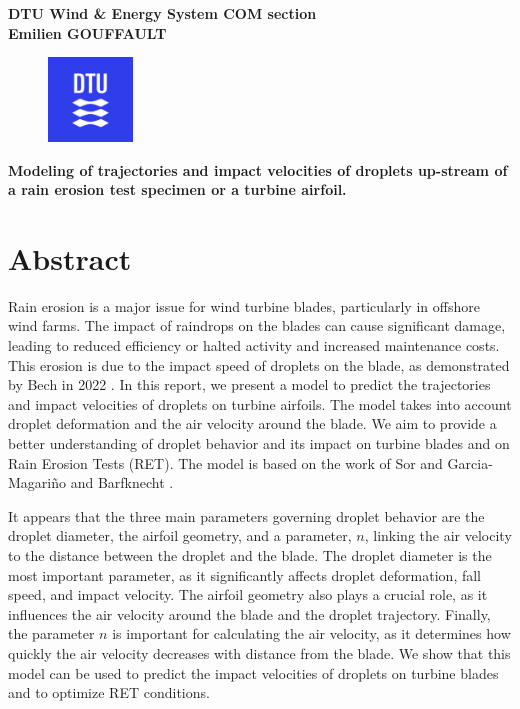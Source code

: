 \documentclass[10pt]{report}
\begin{document}
\noindent

\noindent
{\bf DTU Wind \& Energy System \hfill  COM section\\}
{\bf Emilien GOUFFAULT}

\begin{figure}[H]
    \centering
    \includegraphics[width=0.2\textwidth]{figures/dtuwindenergy_logo.jpeg}
\end{figure}


\begin{center}
{\bf Modeling of trajectories and impact velocities of droplets up-stream of a rain erosion test specimen or a turbine airfoil.}
\end{center}

\section*{Abstract}
\par Rain erosion is a major issue for wind turbine blades, particularly in offshore wind farms. The impact of raindrops on the blades can cause significant damage, leading to reduced efficiency or halted activity and increased maintenance costs. This erosion is due to the impact speed of droplets on the blade, as demonstrated by Bech in 2022 \cite{Bech2022}. In this report, we present a model to predict the trajectories and impact velocities of droplets on turbine airfoils. The model takes into account droplet deformation and the air velocity around the blade. We aim to provide a better understanding of droplet behavior and its impact on turbine blades and on Rain Erosion Tests (RET). The model is based on the work of Sor and Garcia-Magariño \cite{Sor2016} and Barfknecht \cite{Barfknecht2024}.
\par It appears that the three main parameters governing droplet behavior are the droplet diameter, the airfoil geometry, and a parameter, \( n \), linking the air velocity to the distance between the droplet and the blade. The droplet diameter is the most important parameter, as it significantly affects droplet deformation, fall speed, and impact velocity. The airfoil geometry also plays a crucial role, as it influences the air velocity around the blade and the droplet trajectory. Finally, the parameter \( n \) is important for calculating the air velocity, as it determines how quickly the air velocity decreases with distance from the blade. We show that this model can be used to predict the impact velocities of droplets on turbine blades and to optimize RET conditions.
\end{document}
